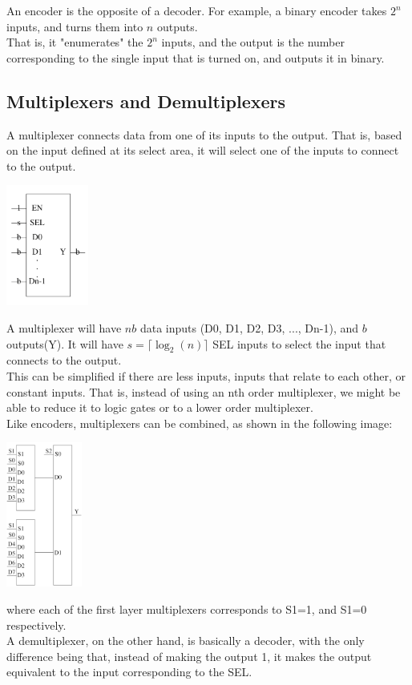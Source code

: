 \documentclass[nobib]{tufte-handout}
\begin{document}
    An encoder is the opposite of a decoder. For example, a binary encoder takes
$2^n$ inputs, and turns them into $n$ outputs.\\ That is, it "enumerates" the
$2^n$ inputs, and the output is the number corresponding to the single input
    that is turned on, and outputs it in binary.\\
    \subsection{Multiplexers and Demultiplexers}
    A multiplexer connects data from one of its inputs to the output. That is,
    based on the input defined at its select area, it will select one of the inputs
    to connect to the output.\\
    \begin{center}
        \includegraphics[height = 150px]{images/multiplexer2.png}
    \end{center}
    A multiplexer will have $nb$ data inputs (D0, D1, D2, D3, ..., Dn-1), and $b$ outputs(Y). It will have $s=\lceil\log_2(n)\rceil$ SEL inputs to select the input that connects to the output.\\
    This can be simplified if there are less inputs, inputs that relate to each other, or constant inputs. That is, instead of using an nth order multiplexer, we might be able to reduce it to logic gates or to a lower order multiplexer.\\
    Like encoders, multiplexers can be combined, as shown in the following image:
    \begin{center}
        \includegraphics[height = 180px]{images/bigmux.png}
    \end{center}
    where each of the first layer multiplexers corresponds to S1=1, and S1=0 respectively.\\
    A demultiplexer, on the other hand, is basically a decoder, with the only difference being that, instead of making the output 1, it makes the output equivalent to the input corresponding to the SEL.\\
\end{document}
